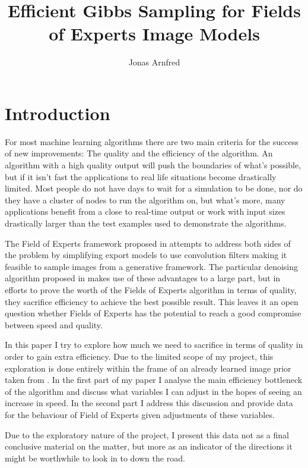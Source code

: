 \documentclass{article}
\begin{document}
\title{Efficient Gibbs Sampling for Fields of Experts Image Models}

\author{Jonas Arnfred}

\maketitle

\section{Introduction}

For most machine learning algorithms there are two main criteria for the 
success of new improvements: The quality and the efficiency of the 
algorithm. An algorithm with a high quality output will push the 
boundaries of what's possible, but if it isn't fast the applications to 
real life situations become drastically limited. Most people do not have 
days to wait for a simulation to be done, nor do they have a cluster of 
nodes to run the algorithm on, but what's more, many applications 
benefit from a close to real-time output or work with input sizes 
drastically larger than the test examples used to demonstrate the 
algorithms.

The Field of Experts framework proposed in \citep{stefan} attempts to 
address both sides of the problem by simplifying export models to use 
convolution filters making it feasible to sample images from a 
generative framework. The particular denoising algorithm proposed in 
\citep{uwe} makes use of these advantages to a large part, but in 
efforts to prove the worth of the Fields of Experts algorithm in terms 
of quality, they sacrifice efficiency to achieve the best possible 
result. This leaves it an open question whether Fields of Experts has 
the potential to reach a good compromise between speed and quality.

In this paper I try to explore how much we need to sacrifice in terms of 
quality in order to gain extra efficiency. Due to the limited scope of 
my project, this exploration is done entirely within the frame of an 
already learned image prior taken from \citep{uwe}. In the first part of 
my paper I analyse the main efficiency bottleneck of the algorithm and 
discuss what variables I can adjust in the hopes of seeing an increase 
in speed. In the second part I address this discussion and provide data 
for the behaviour of Field of Experts given adjustments of these 
variables.

Due to the exploratory nature of the project, I present this data not as 
a final conclusive material on the matter, but more as an indicator of 
the directions it might be worthwhile to look in to down the road.
\end{document}
